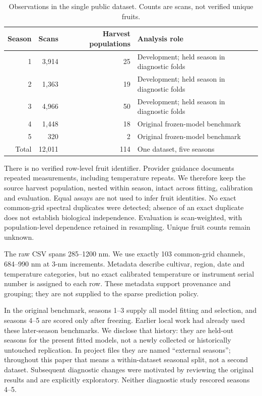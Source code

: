 \documentclass[11pt,a4paper]{article}
\begin{document}
\begin{table}[bp]
\centering
\caption{Observations in the single public dataset. Counts are scans, not verified unique fruits.}\label{tab:data}
\begin{tabular}{rrrl}
\toprule
Season & Scans & Harvest populations & Analysis role \\
\midrule
1 & 3,914 & 25 & Development; held season in diagnostic folds \\
2 & 1,363 & 19 & Development; held season in diagnostic folds \\
3 & 4,966 & 50 & Development; held season in diagnostic folds \\
4 & 1,448 & 18 & Original frozen-model benchmark \\
5 & 320 & 2 & Original frozen-model benchmark \\
\midrule
Total & 12,011 & 114 & One dataset, five seasons \\
\bottomrule
\end{tabular}
\end{table}

There is no verified row-level fruit identifier. Provider guidance documents repeated measurements, including temperature repeats. We therefore keep the source harvest population, nested within season, intact across fitting, calibration and evaluation. Equal assays are not used to infer fruit identities. No exact common-grid spectral duplicates were detected; absence of an exact duplicate does not establish biological independence. Evaluation is scan-weighted, with population-level dependence retained in resampling. Unique fruit counts remain unknown.

The raw CSV spans 285--1200 nm. We use exactly 103 common-grid channels, 684--990 nm at 3-nm increments. Metadata describe cultivar, region, date and temperature categories, but no exact calibrated temperature or instrument serial number is assigned to each row. These metadata support provenance and grouping; they are not supplied to the sparse prediction policy.

In the original benchmark, seasons 1--3 supply all model fitting and selection, and seasons 4--5 are scored only after freezing. Earlier local work had already used these later-season benchmarks. We disclose that history: they are held-out seasons for the present fitted models, not a newly collected or historically untouched replication. In project files they are named ``external seasons''; throughout this paper that means a within-dataset seasonal split, not a second dataset. Subsequent diagnostic changes were motivated by reviewing the original results and are explicitly exploratory. Neither diagnostic study rescored seasons 4--5.
\end{document}
